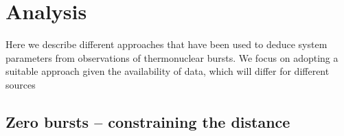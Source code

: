 \documentclass{aastex63}
\newcommand\aastex{AAS\TeX}
\begin{document}
%
%
%
%
%
%
%
%

\section{Analysis} 
\label{sec:analysis}

Here we describe different approaches that have been used to deduce system parameters from observations of thermonuclear bursts.
%
We focus on adopting a suitable approach given the availability of data, which will differ for different sources

\subsection{Zero bursts -- constraining the distance}
\label{subsec:zerobursts}
\end{document}
